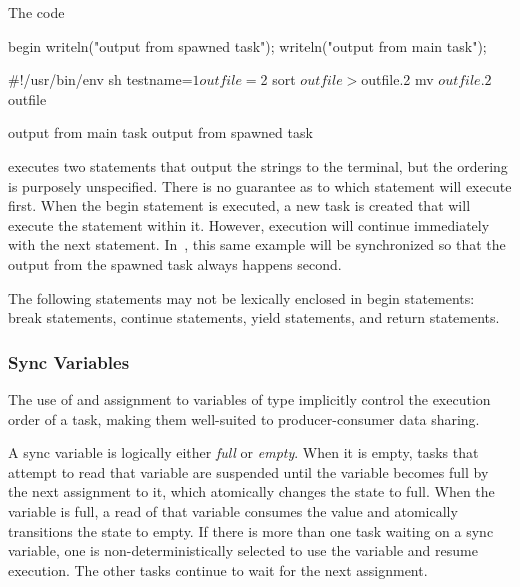 \begin{example}
The code
\begin{chapelpre}
\end{chapelpre}
\begin{chapel}
begin writeln("output from spawned task");
writeln("output from main task");
\end{chapel}
\begin{chapelprediff}
\#!/usr/bin/env sh
testname=$1
outfile=$2
sort $outfile > $outfile.2
mv $outfile.2 $outfile
\end{chapelprediff}
\begin{chapeloutput}
output from main task
output from spawned task
\end{chapeloutput}
executes two  statements that output the strings to the
terminal, but the ordering is purposely unspecified.  There is no
guarantee as to which statement will execute first.  When the
begin statement is executed, a new task is created that will execute
the  statement within it.  However, execution will
continue immediately with the next statement.
In~, this same example will be synchronized so
that the output from the spawned task always happens second.
\end{example}

The following statements may not be lexically enclosed in
begin statements: break statements, continue statements,
yield statements, and return statements.

\subsubsection{Sync Variables}
\label{Sync_Variables}

The use of and assignment to variables of  type implicitly
control the execution order of a task, making them well-suited to
producer-consumer data sharing.

A sync variable is logically either {\em full} or {\em empty}.  When
it is empty, tasks that attempt to read that variable are suspended
until the variable becomes full by the next assignment to it, which
atomically changes the state to full.  When the variable is full, a
read of that variable consumes the value and atomically transitions
the state to empty.  If there is more than one task waiting on a sync
variable, one is non-deterministically selected to use the variable
and resume execution.  The other tasks continue to wait for the next
assignment.

